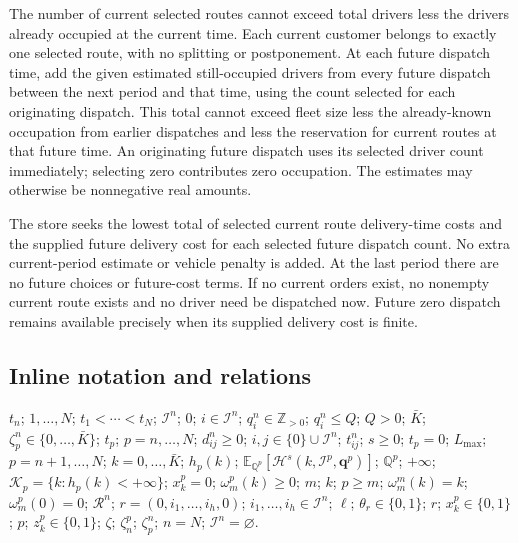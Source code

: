 \documentclass[10pt]{article}
\begin{document}
The number of current selected routes cannot exceed total drivers less the drivers already occupied at the current time. Each current customer belongs to exactly one selected route, with no splitting or postponement. At each future dispatch time, add the given estimated still-occupied drivers from every future dispatch between the next period and that time, using the count selected for each originating dispatch. This total cannot exceed fleet size less the already-known occupation from earlier dispatches and less the reservation for current routes at that future time. An originating future dispatch uses its selected driver count immediately; selecting zero contributes zero occupation. The estimates may otherwise be nonnegative real amounts.

The store seeks the lowest total of selected current route delivery-time costs and the supplied future delivery cost for each selected future dispatch count. No extra current-period estimate or vehicle penalty is added. At the last period there are no future choices or future-cost terms. If no current orders exist, no nonempty current route exists and no driver need be dispatched now. Future zero dispatch remains available precisely when its supplied delivery cost is finite.

\subsection*{Inline notation and relations}
$t_n$; $1,\ldots,N$; $t_1<\cdots<t_N$; $\mathcal I^n$; $0$; $i\in\mathcal I^n$; $q_i^n\in\mathbb Z_{>0}$; $q_i^n\le Q$; $Q>0$; $\bar K$; $\zeta_p^n\in\{0,\ldots,\bar K\}$; $t_p$; $p=n,\ldots,N$; $d_{ij}^n\ge0$; $i,j\in\{0\}\cup\mathcal I^n$; $t_{ij}^n$; $s\ge0$; $t_p=0$; $L_{\max}$; $p=n+1,\ldots,N$; $k=0,\ldots,\bar K$; $h_p(k)$; $\mathbb E_{\mathbb Q^p}[\mathcal H^s(k,\mathcal I^p,\mathbf q^p)]$; $\mathbb Q^p$; $+\infty$; $\mathcal K_p=\{k:h_p(k)<+\infty\}$; $x_k^p=0$; $\omega_m^p(k)\ge0$; $m$; $k$; $p\ge m$; $\omega_m^m(k)=k$; $\omega_m^p(0)=0$; $\mathcal R^n$; $r=(0,i_1,\ldots,i_h,0)$; $i_1,\ldots,i_h\in\mathcal I^n$; $\ell$; $\theta_r\in\{0,1\}$; $r$; $x_k^p\in\{0,1\}$; $p$; $z_k^p\in\{0,1\}$; $\zeta$; $\zeta_n^{p}$; $\zeta_p^n$; $n=N$; $\mathcal I^n=\varnothing$.
\end{document}
